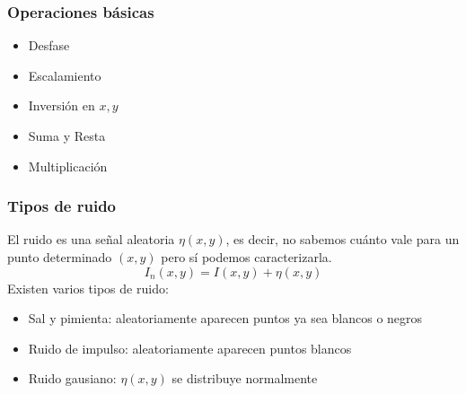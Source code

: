 \begin{frame}\frametitle{Operaciones básicas}
  \begin{itemize}
  \item Desfase
  \item Escalamiento
  \item Inversión en $x,y$
  \item Suma y Resta 
  \item Multiplicación
  \end{itemize}
\end{frame}

\begin{frame}\frametitle{Tipos de ruido}
  El ruido es una señal aleatoria $\eta(x,y)$, es decir, no sabemos cuánto vale para un punto determinado $(x,y)$ pero sí podemos caracterizarla.
  \[I_n(x,y) = I(x,y) + \eta(x,y)\]
  Existen varios tipos de ruido:
  \begin{itemize}
  \item Sal y pimienta: aleatoriamente aparecen puntos ya sea blancos o negros
  \item Ruido de impulso: aleatoriamente aparecen puntos blancos
  \item Ruido gausiano: $\eta(x,y)$ se distribuye normalmente
  \end{itemize}
\end{frame}


